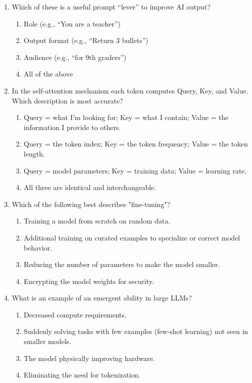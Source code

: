 \documentclass[11pt,a4paper]{article}
\begin{document}
\begin{enumerate}[leftmargin=*, label=\textbf{\#\arabic*}]
  \item Which of these is a useful prompt ``lever'' to improve AI output?\\
    \begin{enumerate}[label=\Alph*)]
      \item Role (e.g., ``You are a teacher'')
      \item Output format (e.g., ``Return 3 bullets'')
      \item Audience (e.g., ``for 9th graders'')
      \item All of the above
    \end{enumerate}

  \item In the self-attention mechanism each token computes Query, Key, and Value. Which description is most accurate?\\
    \begin{enumerate}[label=\Alph*)]
      \item Query = what I'm looking for; Key = what I contain; Value = the information I provide to others.
      \item Query = the token index; Key = the token frequency; Value = the token length.
      \item Query = model parameters; Key = training data; Value = learning rate.
      \item All three are identical and interchangeable.
    \end{enumerate}

  \item Which of the following best describes "fine-tuning"?\\
    \begin{enumerate}[label=\Alph*)]
      \item Training a model from scratch on random data.
      \item Additional training on curated examples to specialize or correct model behavior.
      \item Reducing the number of parameters to make the model smaller.
      \item Encrypting the model weights for security.
    \end{enumerate}

  \item What is an example of an emergent ability in large LLMs?\\
    \begin{enumerate}[label=\Alph*)]
      \item Decreased compute requirements.
      \item Suddenly solving tasks with few examples (few-shot learning) not seen in smaller models.
      \item The model physically improving hardware.
      \item Eliminating the need for tokenization.
    \end{enumerate}


\end{enumerate}
\end{document}

